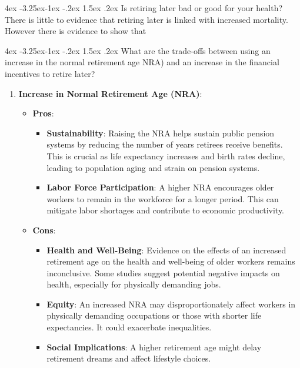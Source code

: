\documentclass[11pt]{report}
\makeatletter
\newcommand{\bb}{\bigbreak\noindent}
\renewcommand\subsection{\leftskip 4ex\@startsection{subsection}{2}{\z@}%
	{-3.25ex\@plus -1ex \@minus -.2ex}%
	{1.5ex \@plus .2ex}%
	{\normalfont\large\bfseries}}
\makeatother
\begin{document}
\begin{spacing}{1.5}
\begin{itemize}[leftmargin=10ex]
	\end{itemize}
	
	
	\subsection{Is retiring later bad or good for your health?}
	There is little to evidence that retiring later is linked with increased mortality. 
	\bb
	However there is evidence to show that 
	
	
	\subsection{What are the trade-offs between using an increase in the normal retirement age NRA) and an increase in the financial incentives to retire later?}

	
	\begin{enumerate}[leftmargin=15ex]
		\item  \textbf{Increase in Normal Retirement Age (NRA)}:
	\begin{itemize}
		\item \textbf{Pros}:
		\begin{itemize}
			\item \textbf{Sustainability}: Raising the NRA helps sustain public pension systems by reducing the number of years retirees receive benefits. This is crucial as life expectancy increases and birth rates decline, leading to population aging and strain on pension systems.
			\item \textbf{Labor Force Participation}: A higher NRA encourages older workers to remain in the workforce for a longer period. This can mitigate labor shortages and contribute to economic productivity.
		\end{itemize}
		\item \textbf{Cons}:
		\begin{itemize}
			\item \textbf{Health and Well-Being}: Evidence on the effects of an increased retirement age on the health and well-being of older workers remains inconclusive. Some studies suggest potential negative impacts on health, especially for physically demanding jobs.
			\item \textbf{Equity}: An increased NRA may disproportionately affect workers in physically demanding occupations or those with shorter life expectancies. It could exacerbate inequalities.
			\item \textbf{Social Implications}: A higher retirement age might delay retirement dreams and affect lifestyle choices.
		\end{itemize}
	\end{itemize}
	

\end{enumerate}
\end{spacing}
\end{document}
